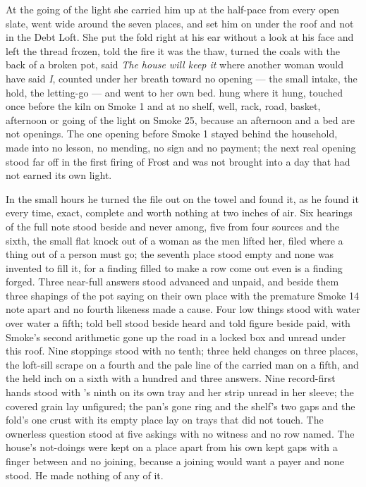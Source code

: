 At the going of the light she carried him up at the half-pace from every open slate, went wide around the seven places, and set him on  under the roof and not in the Debt Loft. She put the fold right at his ear without a look at his face and left the thread frozen, told the fire it was the thaw, turned the coals with the back of a broken pot, said \emph{The house will keep it} where another woman would have said \emph{I}, counted under her breath toward no opening --- the small intake, the hold, the letting-go --- and went to her own bed.  hung where it hung, touched once before the kiln on Smoke 1 and at no shelf, well, rack, road, basket, afternoon or going of the light on Smoke 25, because an afternoon and a bed are not openings. The one opening before Smoke 1 stayed behind the household, made into no lesson, no mending, no sign and no payment; the next real opening stood far off in the first firing of Frost and was not brought into a day that had not earned its own light.

In the small hours he turned the file out on the towel and found it, as he found it every time, exact, complete and worth nothing at two inches of air. Six hearings of the full note stood beside and never among, five from four sources and the sixth, the small flat knock out of a woman as the men lifted her, filed where a thing out of a person must go; the seventh place stood empty and none was invented to fill it, for a finding filled to make a row come out even is a finding forged. Three near-full answers stood advanced and unpaid, and beside them three shapings of the pot saying on their own place with the premature Smoke 14 note apart and no fourth likeness made a cause. Four low things stood with water over water a fifth; told bell stood beside heard and told figure beside paid, with Smoke's second arithmetic gone up the road in a locked box and unread under this roof. Nine stoppings stood with no tenth; three held changes on three places, the loft-sill scrape on a fourth and the pale line of the carried man on a fifth, and the held inch on a sixth with a hundred and three answers. Nine record-first hands stood with 's ninth on its own tray and her strip unread in her sleeve; the covered grain lay unfigured; the pan's gone ring and the shelf's two gaps and the fold's one crust with its empty place lay on trays that did not touch. The ownerless question stood at five askings with no witness and no row named. The house's not-doings were kept on a place apart from his own kept gaps with a finger between and no joining, because a joining would want a payer and none stood. He made nothing of any of it.

